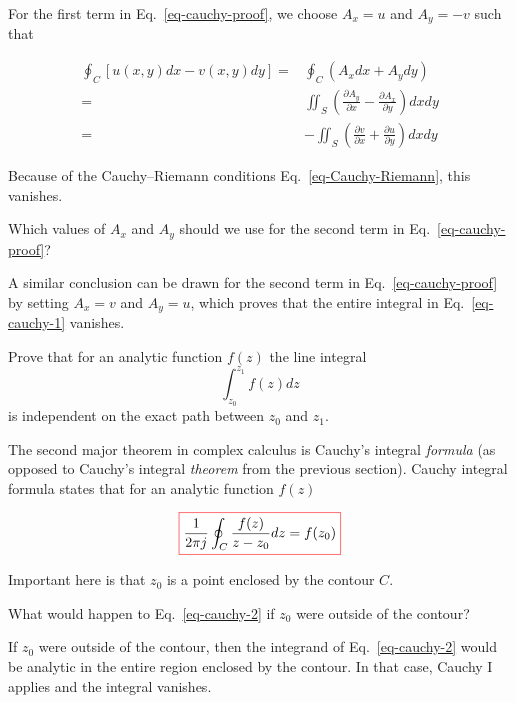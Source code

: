 For the first term in Eq.~\ref{eq-cauchy-proof}, we choose $A_x=u$ and $A_y=-v$ such that

\begin{align}
\oint_{C}\left[u(x,y)dx-v(x,y)dy\right] =& \oint_{{C}} \left(A_x dx + A_y dy\right) \nonumber \\
=& \iint_S \left(\frac{\partial A_y}{\partial x} - \frac{\partial A_x}{\partial y} \right)dx dy \nonumber \\ =& -\iint_S \left(\frac{\partial v}{\partial x} + \frac{\partial u}{\partial y} \right)dx dy 
\end{align} 

Because of the Cauchy--Riemann conditions Eq.~\ref{eq-Cauchy-Riemann}, this
vanishes.

\begin{cue}
Which values of $A_x$ and $A_y$ should we use for the second term in Eq.~\ref{eq-cauchy-proof}?
\end{cue}

A similar conclusion can be drawn for the second term in Eq.~\ref{eq-cauchy-proof} by setting $A_x=v$ and $A_y=u$, which proves that the entire integral in Eq.~\ref{eq-cauchy-1} vanishes.

\begin{exer}
Prove that for an analytic function $f(z)$ the line integral 
$$\int_{z_0}^{z_1}f(z)dz$$
is independent on the exact path between $z_0$ and $z_1$.
\end{exer}



The second major theorem in complex calculus is Cauchy's integral \emph{formula} (as opposed to Cauchy's integral \emph{theorem} from the previous section). Cauchy integral formula states that for an analytic function $f(z)$

\begin{equation}
\fbox{$\displaystyle
\frac{1}{2 \pi j}\oint_{{C}} \frac{f(z)} {z-z_0} dz = f(z_0)
\label{eq-cauchy-2}
$}
\end{equation}

Important here is that $z_0$ is a point enclosed by the contour ${C}$.

\begin{cue}
What would happen to Eq.~\ref{eq-cauchy-2} if  $z_0$ were outside of the contour?  
\end{cue}

If $z_0$ were outside of the contour, then the integrand of Eq.~\ref{eq-cauchy-2} would be analytic in the entire region enclosed by the contour. In that case, Cauchy I applies and the integral vanishes.

